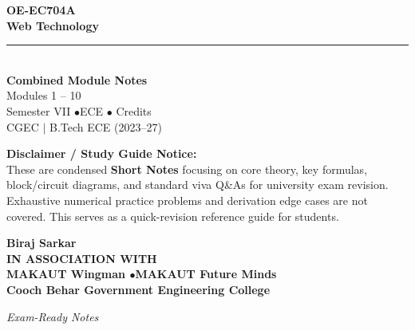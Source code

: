 \documentclass[12pt,a4paper]{article}
\begin{document}
\thispagestyle{empty}


\vspace*{1.0cm}
\begin{center}
  {\Huge\bfseries\color{myred} OE-EC704A}\\[10pt]
  {\LARGE\bfseries\color{mydark} Web Technology}\\[20pt]
  {\color{myred}\rule{0.7\linewidth}{1.5pt}}\\[18pt]
  {\Large\color{myteal}\textbf{Combined Module Notes}}\\[8pt]
  {\large\color{mydark} Modules 1 -- 10}\\[40pt]
  {\normalsize\color{mydark} Semester VII \quad$\bullet$\quad ECE \quad$\bullet$ Credits}\\[12pt]
  {\normalsize\color{mydark} CGEC \;$|$\; B.Tech ECE (2023--27)}
\end{center}
\vspace{1.0cm}
\begin{center}
  \begin{tcolorbox}[colback=mygray, colframe=mgframe, boxrule=0.5pt, arc=3pt, width=0.85\linewidth]
    \centering\small\color{mydark}
    \textbf{Disclaimer / Study Guide Notice:}\\
    These are condensed \textbf{Short Notes} focusing on core theory, key formulas, block/circuit diagrams, and standard viva Q\&As for university exam revision. Exhaustive numerical practice problems and derivation edge cases are not covered. This serves as a quick-revision reference guide for students.
  \end{tcolorbox}
\end{center}
\vfill
\vspace{0.6cm}
\begin{center}
  {\large\bfseries\color{mypurple} Biraj Sarkar}\\[16pt]
  {\footnotesize\color{watermark}\textbf{IN ASSOCIATION WITH}}\\[8pt]
  {\small\bfseries\color{mydark} MAKAUT Wingman \quad$\bullet$\quad MAKAUT Future Minds}\\[12pt]
  {\large\bfseries\color{myteal} Cooch Behar Government Engineering College}
\end{center}
\vfill
\begin{center}{\small\color{watermark}\textit{Exam-Ready Notes}}\end{center}
\clearpage
\end{document}
